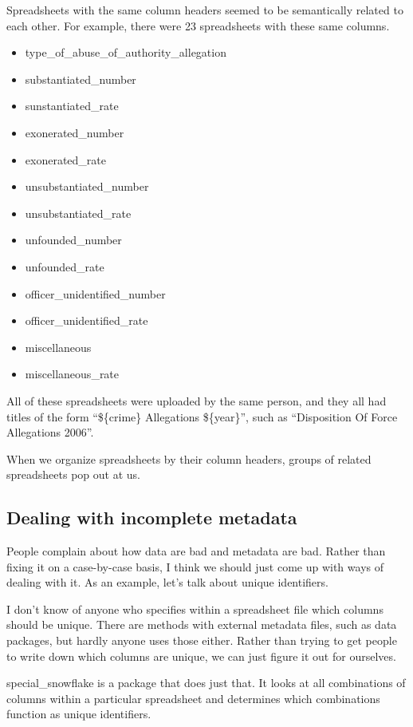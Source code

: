 \documentclass{acm_proc_article-sp}
\begin{document}
Spreadsheets with the same column headers seemed to be semantically related to
each other. For example, there were 23 spreadsheets with these same columns.
\begin{itemize}
\item type\_of\_abuse\_of\_authority\_allegation
\item substantiated\_number
\item sunstantiated\_rate
\item exonerated\_number
\item exonerated\_rate
\item unsubstantiated\_number
\item unsubstantiated\_rate
\item unfounded\_number
\item unfounded\_rate
\item officer\_unidentified\_number
\item officer\_unidentified\_rate
\item miscellaneous
\item miscellaneous\_rate
\end{itemize}

All of these spreadsheets were uploaded by the same person, and they all had
titles of the form ``\$\{crime\} Allegations \$\{year\}'', such as
``Disposition Of Force Allegations 2006''.

When we organize spreadsheets by their column headers, groups of related
spreadsheets pop out at us.

\subsection{Dealing with incomplete metadata}
People complain about how data are bad and metadata are bad. Rather than
fixing it on a case-by-case basis, I think we should just come up with ways
of dealing with it. As an example, let's talk about unique identifiers.

I don't know of anyone who specifies within a spreadsheet file which columns
should be unique. There are methods with external metadata files, such as data
packages\cite{datapackages}, but hardly anyone uses those either. Rather than
trying to get people to write down which columns are unique, we can just figure
it out for ourselves.

special\_snowflake\cite{special_snowflake} is a package that does just that.
It looks at all combinations of columns within a particular spreadsheet and
determines which combinations function as unique identifiers.
\end{document}
